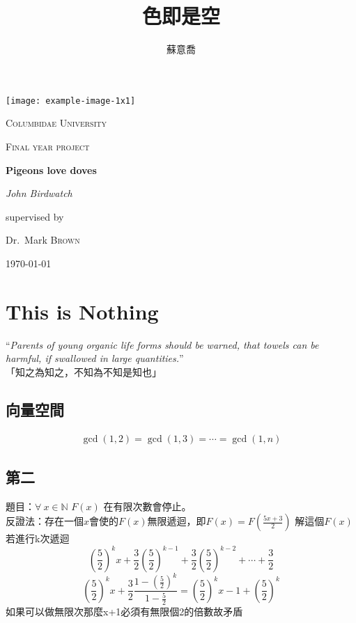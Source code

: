 \documentclass[11pt,b5paper]{book}
\title{色即是空}
\author{蘇意喬}
\begin{document}
	\begin{titlepage}
	\centering
	\texttt{[image: example-image-1x1]}\par\vspace{1cm}
	{\scshape\LARGE Columbidae University \par}
	\vspace{1cm}
	{\scshape\Large Final year project\par}
	\vspace{1.5cm}
	{\huge\bfseries Pigeons love doves\par}
	\vspace{2cm}
	{\Large\itshape John Birdwatch\par}
	\vfill
	supervised by\par
	Dr.~Mark \textsc{Brown}

	\vfill

	{\large \today\par}
	\end{titlepage}

	\maketitle
	\tableofcontents
	\chapter{This is Nothing}
	\begin{flushright}
		\begin{minipage}[r]{0.7\textwidth}
			\begin{flushright}
			``\textit{Parents of young organic life forms should be warned, that
			towels can be harmful, if swallowed in large quantities.}''
			\\[5pt]
			「{\FangSong 知之為知之，不知為不知是知也}」
			\\[5pt]
		\end{flushright}
		\end{minipage}
	\end{flushright}
	
	\section{向量空間}
		\begin{align}
			\label{trivial GCD}
			\gcd (1,2) =\gcd (1,3)=\cdots=\gcd(1,n)
		\end{align}
	\section{第二}
題目：$\forall\ x \in \mathbb{N}$ $F(x)$ 在有限次數會停止。\\
反證法：存在一個$x$會使的$F(x)$無限遞迴，即$F(x)=F(\frac{5x+3}{2})$
解這個$F(x)$若進行k次遞迴
\[(\frac{5}{2})^kx+\frac{3}{2}(\frac{5}{2})^{k-1}+\frac{3}{2}(\frac{5}{2})^{k-2}+\cdots+\frac{3}{2}\]
\[(\frac{5}{2})^k x + \frac{3}{2}\frac{1-(\frac{5}{2})^{k}}{1-\frac{5}{2}} = (\frac{5}{2})^k x - 1 +(\frac{5}{2})^k\]
如果可以做無限次那麼x+1必須有無限個2的倍數故矛盾
\end{document}
